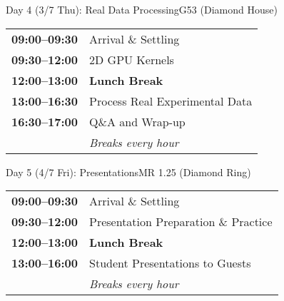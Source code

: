 \documentclass[11pt, a4paper]{article}
\begin{document}
\vspace{1em}

\begin{daycard}{Day 4 (3/7 Thu): Real Data Processing}{G53 (Diamond House)}
\begin{tabular}{@{}p{2.8cm}p{\dimexpr\linewidth-3.1cm}@{}}
\textbf{\color{textmuted}09:00--09:30} & Arrival \& Settling \\
\textbf{\color{textmuted}09:30--12:00} & 2D GPU Kernels \\
\textbf{\color{textmuted}12:00--13:00} & \textbf{Lunch Break} \\
\textbf{\color{textmuted}13:00--16:30} & Process Real Experimental Data \\
\textbf{\color{textmuted}16:30--17:00} & Q\&A and Wrap-up \\[0.3em]
& \textit{\color{textsecondary}Breaks every hour}
\end{tabular}
\end{daycard}

\vspace{1em}

\begin{daycard}{Day 5 (4/7 Fri): Presentations}{MR 1.25 (Diamond Ring)}
\begin{tabular}{@{}p{2.8cm}p{\dimexpr\linewidth-3.1cm}@{}}
\textbf{\color{textmuted}09:00--09:30} & Arrival \& Settling \\
\textbf{\color{textmuted}09:30--12:00} & Presentation Preparation \& Practice \\
\textbf{\color{textmuted}12:00--13:00} & \textbf{Lunch Break} \\
\textbf{\color{textmuted}13:00--16:00} & Student Presentations to Guests \\[0.3em]
& \textit{\color{textsecondary}Breaks every hour}
\end{tabular}
\end{daycard}
\end{document}
